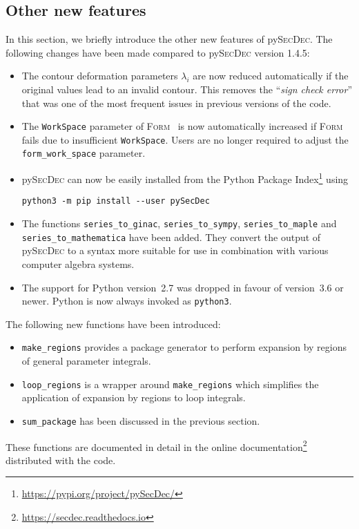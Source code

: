 \documentclass[Physsubmission, Phys]{SciPost}
\newcommand{\pysecdec}{py{\textsc{SecDec}}}
\newcommand{\form}{{\textsc{Form}}}
\begin{document}
\subsection{Other new features}
\label{subsec:22}

In this section, we briefly introduce the other new features of \pysecdec{}. The following changes have been made compared to \pysecdec{} version 1.4.5:
\begin{itemize}

\item The contour deformation parameters $\lambda_i$ are now reduced automatically if the original values lead to an invalid contour.
  This removes the ``\textit{sign check error}'' that was one of the most frequent issues in previous versions of the code.

\item The \texttt{WorkSpace} parameter of \form{}~\cite{Kuipers:2013pba,Ruijl:2017dtg} is now automatically increased if \form{} fails due to insufficient \texttt{WorkSpace}. Users are no longer required to adjust the  \texttt{form\_work\_space} parameter.

\item \pysecdec{} can now be easily installed from the Python Package Index\footnote{\url{https://pypi.org/project/pySecDec/}} using
\begin{verbatim}
python3 -m pip install --user pySecDec 
\end{verbatim}

\item The functions \texttt{series\_to\_ginac}, \texttt{series\_to\_sympy}, \texttt{series\_to\_maple} and \\
\texttt{series\_to\_mathematica} have been added. They convert the output of \pysecdec{} to a syntax more suitable for use in combination with various computer algebra systems. 

\item The support for Python version~2.7 was dropped in favour of version~3.6 or newer. Python is now always invoked as \texttt{python3}.

\end{itemize}
The following new functions have been introduced:
\begin{itemize}
\item \texttt{make\_regions} provides a package generator to perform expansion by regions of general parameter integrals.
\item \texttt{loop\_regions} is a wrapper around \texttt{make\_regions} which simplifies the application of expansion by regions to loop integrals.
\item \texttt{sum\_package} has been discussed in the previous section.
\end{itemize}
These functions are documented in detail in the online documentation\footnote{\url{https://secdec.readthedocs.io}} distributed with the code.
\end{document}
